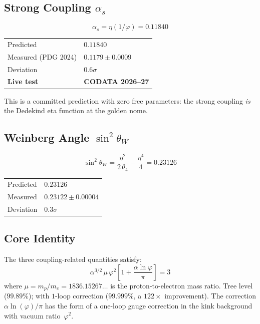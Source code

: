 \documentclass[11pt,a4paper]{article}
\newcommand{\vp}{\varphi}
\newcommand{\me}{m_e}
\newcommand{\mpr}{m_p}
\begin{document}
\subsection{Strong Coupling $\alpha_s$}

\begin{equation}
  \boxed{\alpha_s = \eta(1/\vp) = 0.11840}
\end{equation}

\begin{center}
\begin{tabular}{ll}
\toprule
Predicted & $0.11840$ \\
Measured (PDG 2024) & $0.1179 \pm 0.0009$ \\
Deviation & $0.6\sigma$ \\
\midrule
\textbf{Live test} & \textbf{CODATA 2026--27} \\
\bottomrule
\end{tabular}
\end{center}

This is a committed prediction with zero free parameters: the strong coupling
\emph{is} the Dedekind eta function at the golden nome.

\subsection{Weinberg Angle $\sin^2\!\theta_W$}

\begin{equation}
  \boxed{\sin^2\!\theta_W
  = \frac{\eta^2}{2\,\theta_4} - \frac{\eta^4}{4}
  = 0.23126}
\end{equation}

\begin{center}
\begin{tabular}{ll}
\toprule
Predicted & $0.23126$ \\
Measured & $0.23122 \pm 0.00004$ \\
Deviation & $0.3\sigma$ \\
\bottomrule
\end{tabular}
\end{center}

\subsection{Core Identity}

The three coupling-related quantities satisfy:
\begin{equation}
  \boxed{
  \alpha^{3/2}\,\mu\,\vp^2
  \left[1 + \frac{\alpha\ln\vp}{\pi}\right] = 3
  }
\end{equation}
where $\mu = \mpr/\me = 1836.15267\ldots$ is the proton-to-electron mass ratio.
Tree level ($99.89\%$); with $1$-loop correction ($99.999\%$, a $122\times$ improvement).
The correction $\alpha\ln(\vp)/\pi$ has the form of a one-loop gauge
correction in the kink background with vacuum ratio~$\vp^2$.
\end{document}

